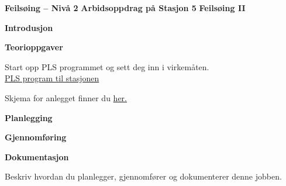 

\noindent

\vskip 5pt

\begin{center}
\textbf{Feilsøing -- Nivå 2 }
\vskip 5pt 
\textbf{Arbidsoppdrag på Stasjon 5}
\vskip 5pt 
\textbf{Feilsøing II}
\end{center}


\textbf{Introdusjon}

\vskip 5pt 

\vskip 5pt 


\vskip 10pt 
\textbf{Teorioppgaver}

Start opp PLS programmet og sett deg inn i virkemåten.\\
\href{https://rfka-my.sharepoint.com/:u:/g/personal/fred-olav_mosdal_skole_rogfk_no/Ebw4MugqIk9IkNW0xOTeOtMBU5aTkfC_XWkhlCSTiTU62A?e=qM1QLI}{PLS program til stasjonen}

\vskip 5pt 
Skjema for anlegget finner du \href{https://rfka-my.sharepoint.com/:u:/g/personal/fred-olav_mosdal_skole_rogfk_no/EfUrPOgJexZLiXL5tWK_tVIBmfgED9RbsoItP9EguvaPCg?e=f5Ydh4}{her.}
\vskip 5pt 

\vskip 10pt 
\textbf{Planlegging}


\vskip 10pt 
\textbf{Gjennomføring}

\vskip 10pt 
\textbf{Dokumentasjon}

Beskriv hvordan du planlegger, gjennomfører og dokumenterer denne jobben. 





















\vfil \eject

















